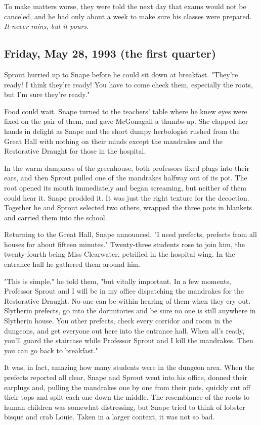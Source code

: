 To make matters worse, they were told the next day that exams would not be canceled, and he had only about a week to make sure his classes were prepared. \emph{It never rains, but it pours.}

\subsection{Friday, May 28, 1993 (the first quarter)}

Sprout hurried up to Snape before he could sit down at breakfast. "They're ready! I think they're ready! You have to come check them, especially the roots, but I'm sure they're ready."

Food could wait. Snape turned to the teachers' table where he knew eyes were fixed on the pair of them, and gave McGonagall a thumbs-up. She clapped her hands in delight as Snape and the short dumpy herbologist rushed from the Great Hall with nothing on their minds except the mandrakes and the Restorative Draught for those in the hospital.

In the warm dampness of the greenhouse, both professors fixed plugs into their ears, and then Sprout pulled one of the mandrakes halfway out of its pot. The root opened its mouth immediately and began screaming, but neither of them could hear it. Snape prodded it. It was just the right texture for the decoction. Together he and Sprout selected two others, wrapped the three pots in blankets and carried them into the school.

Returning to the Great Hall, Snape announced, "I need prefects, prefects from all houses for about fifteen minutes." Twenty-three students rose to join him, the twenty-fourth being Miss Clearwater, petrified in the hospital wing. In the entrance hall he gathered them around him.

"This is simple," he told them, "but vitally important. In a few moments, Professor Sprout and I will be in my office dispatching the mandrakes for the Restorative Draught. No one can be within hearing of them when they cry out. Slytherin prefects, go into the dormitories and be sure no one is still anywhere in Slytherin house. You other prefects, check every corridor and room in the dungeons, and get everyone out here into the entrance hall. When all's ready, you'll guard the staircase while Professor Sprout and I kill the mandrakes. Then you can go back to breakfast."

It was, in fact, amazing how many students were in the dungeon area. When the prefects reported all clear, Snape and Sprout went into his office, donned their earplugs and, pulling the mandrakes one by one from their pots, quickly cut off their tops and split each one down the middle. The resemblance of the roots to human children was somewhat distressing, but Snape tried to think of lobster bisque and crab Louie. Taken in a larger context, it was not so bad.

